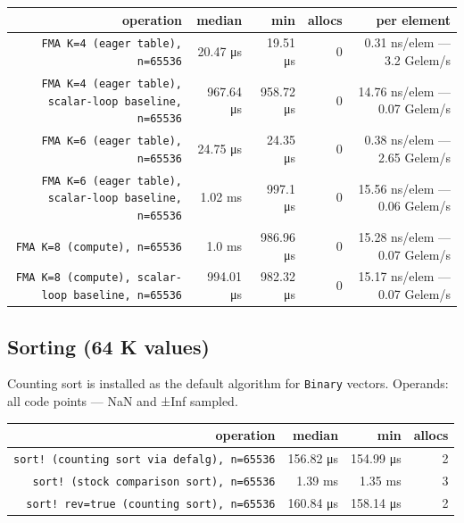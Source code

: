 \begin{table}[h]
\centering
\begin{tabulary}{\linewidth}{R R R R R}
\toprule
operation & median & min & allocs & per element \\
\toprule
\texttt{FMA K=4 (eager table), n=65536} & 20.47 μs & 19.51 μs & 0 & 0.31 ns/elem — 3.2 Gelem/s \\
\texttt{FMA K=4 (eager table), scalar-loop baseline, n=65536} & 967.64 μs & 958.72 μs & 0 & 14.76 ns/elem — 0.07 Gelem/s \\
\texttt{FMA K=6 (eager table), n=65536} & 24.75 μs & 24.35 μs & 0 & 0.38 ns/elem — 2.65 Gelem/s \\
\texttt{FMA K=6 (eager table), scalar-loop baseline, n=65536} & 1.02 ms & 997.1 μs & 0 & 15.56 ns/elem — 0.06 Gelem/s \\
\texttt{FMA K=8 (compute), n=65536} & 1.0 ms & 986.96 μs & 0 & 15.28 ns/elem — 0.07 Gelem/s \\
\texttt{FMA K=8 (compute), scalar-loop baseline, n=65536} & 994.01 μs & 982.32 μs & 0 & 15.17 ns/elem — 0.07 Gelem/s \\
\bottomrule
\end{tabulary}

\end{table}



\subsection{Sorting (64 K values)}



\label{10624969220324633770}{}


Counting sort is installed as the default algorithm for \texttt{Binary} vectors. Operands: all code points — NaN and ±Inf sampled.




\begin{table}[h]
\centering
\begin{tabulary}{\linewidth}{R R R R}
\toprule
operation & median & min & allocs \\
\toprule
\texttt{sort! (counting sort via defalg), n=65536} & 156.82 μs & 154.99 μs & 2 \\
\texttt{sort! (stock comparison sort), n=65536} & 1.39 ms & 1.35 ms & 3 \\
\texttt{sort! rev=true (counting sort), n=65536} & 160.84 μs & 158.14 μs & 2 \\
\bottomrule
\end{tabulary}

\end{table}




